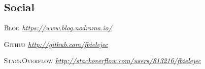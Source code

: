 \documentclass[a4paper, oneside, final]{scrartcl}
\newenvironment{lyxlist}[1]
{\begin{list}{}
{\settowidth{\labelwidth}{#1}
 \setlength{\leftmargin}{\labelwidth}
 \addtolength{\leftmargin}{\labelsep}
 \renewcommand{\makelabel}[1]{##1\hfil}}}
{\end{list}}
\newcommand{\noun}[1]{\textsc{#1}}
\begin{document}
\begin{center}
\section{Social}

 \begin{lyxlist}{00.00.0000}

 \item [{\noun{\scriptsize Blog}}] \emph{ \url{https://www.blog.nodrama.io/} }

 \item [{\noun{\scriptsize Github}}] \emph{ \url{http://github.com/fbielejec} }

 \item [{\noun{\scriptsize StackOverflow}}] \emph{ \url{http://stackoverflow.com/users/813216/fbielejec }}

\end{lyxlist}

\end{center}
\end{document}
